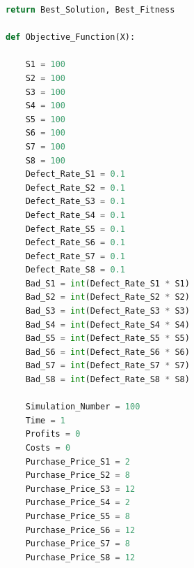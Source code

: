 \documentclass[withoutpreface,bwprint]{cumcmthesis} %
\begin{document}
\begin{appendices}
\begin{lstlisting}[language=python]
        return Best_Solution, Best_Fitness

def Objective_Function(X):

    S1 = 100
    S2 = 100
    S3 = 100
    S4 = 100
    S5 = 100
    S6 = 100
    S7 = 100
    S8 = 100
    Defect_Rate_S1 = 0.1
    Defect_Rate_S2 = 0.1
    Defect_Rate_S3 = 0.1
    Defect_Rate_S4 = 0.1
    Defect_Rate_S5 = 0.1
    Defect_Rate_S6 = 0.1
    Defect_Rate_S7 = 0.1
    Defect_Rate_S8 = 0.1
    Bad_S1 = int(Defect_Rate_S1 * S1)
    Bad_S2 = int(Defect_Rate_S2 * S2)
    Bad_S3 = int(Defect_Rate_S3 * S3)
    Bad_S4 = int(Defect_Rate_S4 * S4)
    Bad_S5 = int(Defect_Rate_S5 * S5)
    Bad_S6 = int(Defect_Rate_S6 * S6)
    Bad_S7 = int(Defect_Rate_S7 * S7)
    Bad_S8 = int(Defect_Rate_S8 * S8)

    Simulation_Number = 100
    Time = 1
    Profits = 0
    Costs = 0
    Purchase_Price_S1 = 2
    Purchase_Price_S2 = 8
    Purchase_Price_S3 = 12
    Purchase_Price_S4 = 2
    Purchase_Price_S5 = 8
    Purchase_Price_S6 = 12
    Purchase_Price_S7 = 8
    Purchase_Price_S8 = 12


\end{lstlisting}
\end{appendices}
\end{document}
